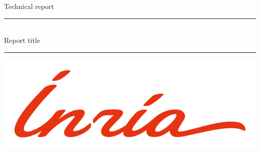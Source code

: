 \documentclass[11pt, a4paper]{article}
\begin{document}
\begin{task}
    \begin{gridlayout}{\textwidth}{15cm}
        \begin{row}{0.1}
            \begin{cell}{1}
                \centering
                Technical report
            \end{cell}
        \end{row}
        \begin{row}{0.15}
            \begin{cell}{1}
            \end{cell}
        \end{row}
        \begin{row}{0.15}
            \begin{cell}{1}
                \centering
                \rule{0.6\cellwidth}{0.4pt}\\[1.5ex]
                {\Large Report title}\\
                \rule{0.6\cellwidth}{0.4pt}
            \end{cell}
        \end{row}
        \begin{row}{0.3}
            \begin{cell}{1}
            \end{cell}
        \end{row}
        \begin{row}{0.3}
            \begin{cell}{0.5}
                \centering
                \includegraphics[width=\cellwidth]{img/logo-inria.png}
            \end{cell}
            \begin{cell}{0.5}
                \centering

\end{cell}
\end{row}
\end{gridlayout}
\end{task}
\end{document}
